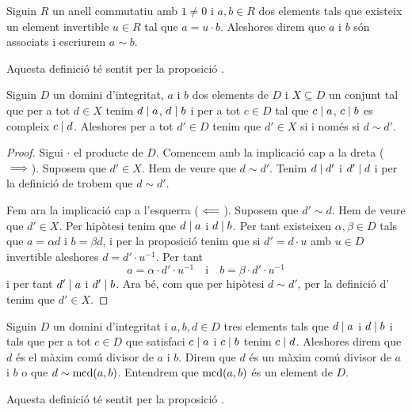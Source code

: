 \documentclass[../Apunts.tex]{subfiles}
\begin{document}
	\begin{definition}
		\label{def:elements associats}
		Siguin \(R\) un anell commutatiu amb \(1\neq0\) i \(a,b\in R\) dos elements tals que existeix un element invertible \(u\in R\) tal que \(a=u\cdot b\). Aleshores direm que \(a\) i \(b\) són associats i escriurem \(a\sim b\).
		
		Aquesta definició té sentit per la proposició .
	\end{definition}
	\begin{proposition}
		\label{prop:màxim comú divisor anells}
		Siguin \(D\) un domini d'integritat, \(a\) i \(b\) dos elements de \(D\) i \(X\subseteq D\) un conjunt tal que per a tot \(d\in X\) tenim \(d\mathrel{|} a\), \(d\mathrel{|} b\) i per a tot \(c\in D\) tal que \(c\mathrel{|} a\), \(c\mathrel{|} b\) es compleix \(c\mathrel{|} d\). Aleshores per a tot \(d'\in D\) tenim que \(d'\in X\) si i només si \(d\sim d'\).
		\begin{proof}
			Sigui \(\cdot\) el producte de \(D\). Comencem amb la implicació cap a la dreta (\(\implies\)). Suposem que \(d'\in X\). Hem de veure que \(d\sim d'\). Tenim \(d\mathrel{|} d'\) i \(d'\mathrel{|} d\) i per la definició de  trobem que \(d\sim d'\).
			
			Fem ara la implicació cap a l'esquerra (\(\impliedby\)). Suposem que \(d'\sim d\). Hem de veure que \(d'\in X\). Per hipòtesi tenim que \(d\mathrel{|} a\) i \(d\mathrel{|} b\). Per tant existeixen \(\alpha,\beta\in D\) tals que \(a=\alpha d\) i \(b=\beta d\), i per la proposició  tenim que si \(d'=d\cdot u\) amb \(u\in D\) invertible aleshores \(d=d'\cdot u^{-1}\). Per tant
			\[a=\alpha\cdot d'\cdot u^{-1}\quad\text{i}\quad b=\beta\cdot d'\cdot u^{-1}\]
			i per tant \(d'\mathrel{|} a\) i \(d'\mathrel{|} b\). Ara bé, com que per hipòtesi \(d\sim d'\), per la definició d' tenim que \(d'\in X\).
		\end{proof}
	\end{proposition}
	\begin{definition}
		\label{def:màxim comú divisor anells}
		\label{def:mcd anells}
		Siguin \(D\) un domini d'integritat i \(a,b,d\in D\) tres elements tals que \(d\mathrel{|} a\) i \(d\mathrel{|} b\) i tals que per a tot \(c\in D\) que satisfaci \(c\mathrel{|} a\) i \(c\mathrel{|} b\) tenim \(c\mathrel{|} d\). Aleshores direm que \(d\) és el màxim comú divisor de \(a\) i \(b\). Direm que \(d\) és un màxim comú divisor de \(a\) i \(b\) o que \(d\sim\operatorname{mcd}(a,b)\).
		Entendrem que \(\operatorname{mcd}(a,b)\) és un element de \(D\).
		
		Aquesta definició té sentit per la proposició .
	\end{definition}
\end{document}
